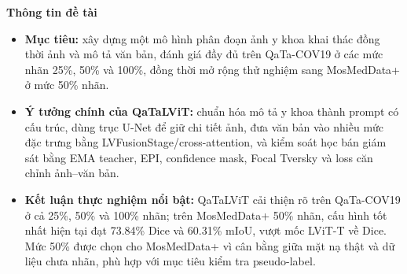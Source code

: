 \vspace{0.8cm}

{\bfseries Thông tin đề tài}

\begin{itemize}
  \item \textbf{Mục tiêu:} xây dựng một mô hình phân đoạn ảnh y khoa khai thác đồng thời ảnh và mô tả văn bản, đánh giá đầy đủ trên QaTa-COV19 ở các mức nhãn 25\%, 50\% và 100\%, đồng thời mở rộng thử nghiệm sang MosMedData+ ở mức 50\% nhãn.
\item \textbf{Ý tưởng chính của QaTaLViT:} chuẩn hóa mô tả y khoa thành prompt có cấu trúc, dùng trục U-Net để giữ chi tiết ảnh, đưa văn bản vào nhiều mức đặc trưng bằng LVFusionStage/cross-attention, và kiểm soát học bán giám sát bằng EMA teacher, EPI, confidence mask, Focal Tversky và loss căn chỉnh ảnh--văn bản.
  \item \textbf{Kết luận thực nghiệm nổi bật:} QaTaLViT cải thiện rõ trên QaTa-COV19 ở cả 25\%, 50\% và 100\% nhãn; trên MosMedData+ 50\% nhãn, cấu hình tốt nhất hiện tại đạt 73.84\% Dice và 60.31\% mIoU, vượt mốc LViT-T về Dice. Mức 50\% được chọn cho MosMedData+ vì cân bằng giữa mặt nạ thật và dữ liệu chưa nhãn, phù hợp với mục tiêu kiểm tra pseudo-label.
\end{itemize}
